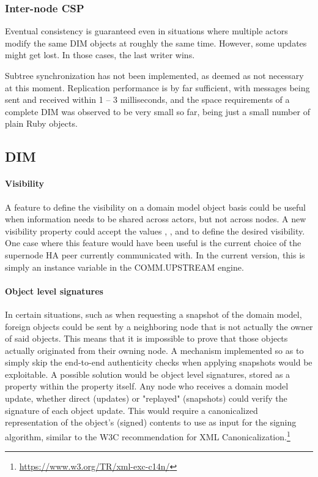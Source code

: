 \subsubsection{Inter-node CSP}
Eventual consistency is guaranteed even in situations where multiple actors
modify the same DIM objects at roughly the same time. However, some updates
might get lost. In those cases, the last writer wins.

Subtree synchronization has not been implemented, as deemed as not necessary at
this moment. Replication performance is by far sufficient, with messages being
sent and received within 1 -- 3 milliseconds, and the space requirements of a
complete DIM was observed to be very small so far, being just a small number of
plain Ruby objects.

\subsection{DIM}
\paragraph{Visibility}
A feature to define the visibility on a domain model object basis could be
useful when information needs to be shared across actors, but not across nodes.
A new visibility property could accept the values , , and  to define the desired visibility.
One case where this feature would have been useful is the current choice of the
supernode HA peer currently communicated with. In the current version, this is
simply an instance variable in the COMM.UPSTREAM engine.

\paragraph{Object level signatures}
In certain situations, such as when requesting a snapshot of the domain model,
foreign objects could be sent by a neighboring node that is not actually the owner
of said objects. This means that it is impossible to prove that those objects
actually originated from their owning node. A mechanism implemented so as to
simply skip the end-to-end authenticity checks when applying snapshots would be
exploitable. A possible solution would be object level signatures, stored as a
property within the property itself. Any node who receives a domain model
update, whether direct (updates) or "replayed" (snapshots) could verify the
signature of each object update. This would require a canonicalized
representation of the object's (signed) contents to use as input for the
signing algorithm, similar to the W3C recommendation for XML
Canonicalization.\footnote{\url{https://www.w3.org/TR/xml-exc-c14n/}}

